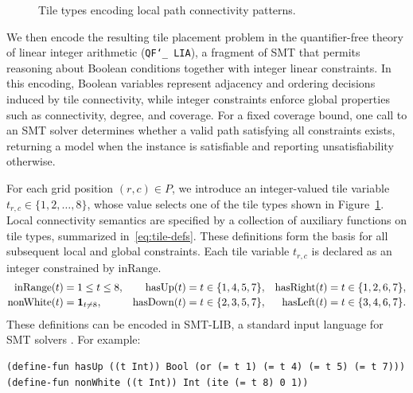 \documentclass[acmsmall,screen,nonacm]{acmart}
\newcommand{\QFLIA}{\texttt{QF\char`_ LIA}}
\begin{document}
\begin{figure}[h!tbp]
  \centering
  \resizebox{0.96\linewidth}{!}{%
  }
  \caption{Tile types encoding local path connectivity patterns.}
  \label{fig:tiles}
\end{figure}

We then encode the resulting tile placement problem in the
quantifier-free theory of linear integer arithmetic (\QFLIA), a
fragment of SMT that permits reasoning about Boolean conditions
together with integer linear constraints. In this encoding, Boolean
variables represent adjacency and ordering decisions induced by tile
connectivity, while integer constraints enforce global properties such
as connectivity, degree, and coverage. For a fixed coverage bound, one
call to an SMT solver determines whether a valid path satisfying all
constraints exists, returning a model when the instance is satisfiable
and reporting unsatisfiability otherwise.

For each grid position \((r,c) \in P\), we introduce an integer-valued
tile variable \(t_{r,c} \in \{1,2,\dots,8\}\), whose value selects one
of the tile types shown in Figure~\ref{fig:tiles}. Local connectivity
semantics are specified by a collection of auxiliary functions on tile
types, summarized in~\eqref{eq:tile-defs}. These definitions form the
basis for all subsequent local and global constraints. Each tile
variable \(t_{r,c}\) is declared as an integer constrained by
\(\mathrm{inRange}\).
\begin{equation}
\label{eq:tile-defs}
\setlength{\jot}{2pt}
\begin{aligned}
\mathrm{inRange}(t)
&= 1 \le t \le 8,
&
\mathrm{hasUp}(t)
&= t \in \{1,4,5,7\},
&
\mathrm{hasRight}(t)
&= t \in \{1,2,6,7\},
\\
\mathrm{nonWhite}(t)
&= \mathbf{1}_{t \neq 8},
&
\mathrm{hasDown}(t)
&= t \in \{2,3,5,7\},
&
\mathrm{hasLeft}(t)
&= t \in \{3,4,6,7\}.
\end{aligned}
\end{equation}
These definitions can be encoded in SMT-LIB, a standard input language
for SMT solvers \cite{SMTLIBStandard}. For example:
\begin{tcolorbox}[smtsimple]
\begin{verbatim}
(define-fun hasUp ((t Int)) Bool (or (= t 1) (= t 4) (= t 5) (= t 7)))
(define-fun nonWhite ((t Int)) Int (ite (= t 8) 0 1))
\end{verbatim}
\end{tcolorbox}
\end{document}
